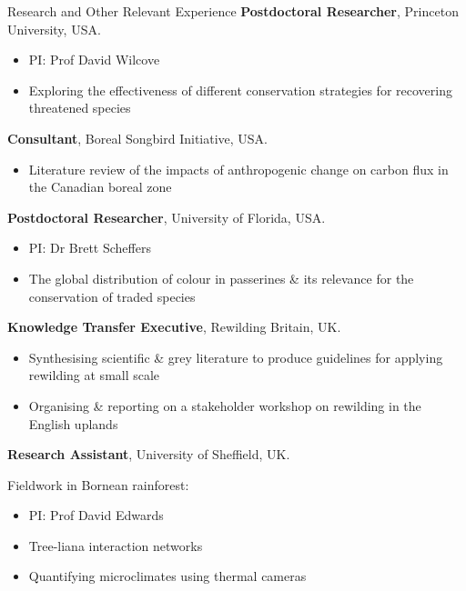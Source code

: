\renewcommand\labelitemi{$\diamond$}

\begin{rubric}{Research and Other Relevant Experience}
%
	\textbf{Postdoctoral Researcher}, Princeton University, USA.
	\begin{itemize}[topsep=0pt,itemsep=-1ex,partopsep=1ex,parsep=1ex]
	\item PI: Prof David Wilcove
	\item Exploring the effectiveness of different conservation strategies for recovering threatened species
	\end{itemize}
\entry*[2020]%
	\textbf{Consultant}, Boreal Songbird Initiative, USA.
	\begin{itemize}[topsep=0pt,itemsep=-1ex,partopsep=1ex,parsep=1ex]
	\item Literature review of the impacts of anthropogenic change on carbon flux in the Canadian boreal zone
	\end{itemize}
\entry*[2019]%
	\textbf{Postdoctoral Researcher}, University of Florida, USA.
	\begin{itemize}[topsep=0pt,itemsep=-1ex,partopsep=1ex,parsep=1ex]
	\item PI: Dr Brett Scheffers
	\item The global distribution of colour in passerines \& its relevance for the conservation of traded species
	\end{itemize}
\entry*[2016]%
	\textbf{Knowledge Transfer Executive}, Rewilding Britain, UK.
	\begin{itemize}[topsep=0pt,itemsep=-1ex,partopsep=1ex,parsep=1ex]
	\item Synthesising scientific \& grey literature to produce guidelines for applying rewilding at small scale
	\item Organising \& reporting on a stakeholder workshop on rewilding in the English uplands \parencite{sandom_rewilding_2018}
	\end{itemize}
\entry*[2014]%
	\textbf{Research Assistant}, University of Sheffield, UK.
	\par Fieldwork in Bornean rainforest:
	\begin{itemize}[topsep=0pt,itemsep=-1ex,partopsep=1ex,parsep=1ex]
	\item PI: Prof David Edwards
	\item Tree-liana interaction networks \parencite{magrach_selective_2016}
	\item Quantifying microclimates using thermal cameras \parencite{scheffers_extreme_2017}

\end{itemize}
\end{rubric}

